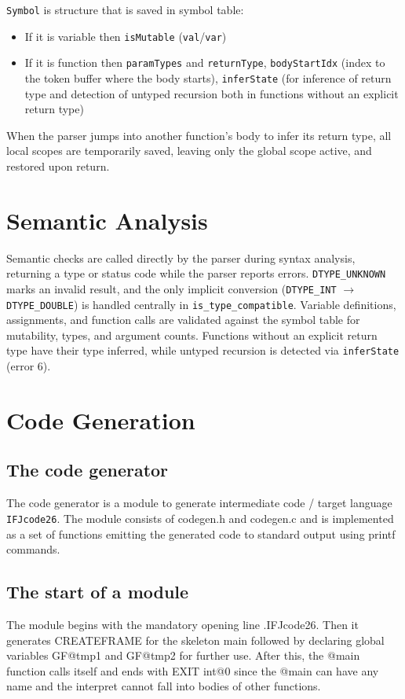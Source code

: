 \documentclass[12pt,a4paper]{article}
\begin{document}
\texttt{Symbol} is structure that is saved in symbol table:
\begin{itemize}
  \item If it is variable then \texttt{isMutable} (\texttt{val}/\texttt{var})
  \item If it is function then \texttt{paramTypes} and \texttt{returnType}, \texttt{bodyStartIdx} (index to the token buffer where the body starts), \texttt{inferState} (for inference of return type and detection of untyped recursion both in functions without an explicit return type)
\end{itemize}

When the parser jumps into another function's body to infer its return type, all local scopes are temporarily saved, leaving only the global scope active, and restored upon return.

\section{Semantic Analysis}      
Semantic checks are called directly by the parser during syntax analysis, returning a type or status code while the parser reports errors. \texttt{DTYPE\_UNKNOWN} marks an invalid result, and the only implicit conversion (\texttt{DTYPE\_INT} $\rightarrow$ \texttt{DTYPE\_DOUBLE}) is handled centrally in \texttt{is\_type\_compatible}. Variable definitions, assignments, and function calls are validated against the symbol table for mutability, types, and argument counts. Functions without an explicit return type have their type inferred, while untyped recursion is detected via \texttt{inferState} (error 6).

\section{Code Generation}         
\subsection{The code generator}
The code generator is a module to generate intermediate code / target language \texttt{IFJcode26}. The
module consists of codegen.h and codegen.c and is implemented as a set of functions emitting the
generated code to standard output using printf commands.

\subsection{The start of a module}
The module begins with the mandatory opening line .IFJcode26. Then it generates
CREATEFRAME for the skeleton main followed by declaring global variables GF@tmp1 and GF@tmp2
for further use. After this, the @main function calls itself and ends with EXIT int@0 since the @main
can have any name and the interpret cannot fall into bodies of other functions.
\end{document}
